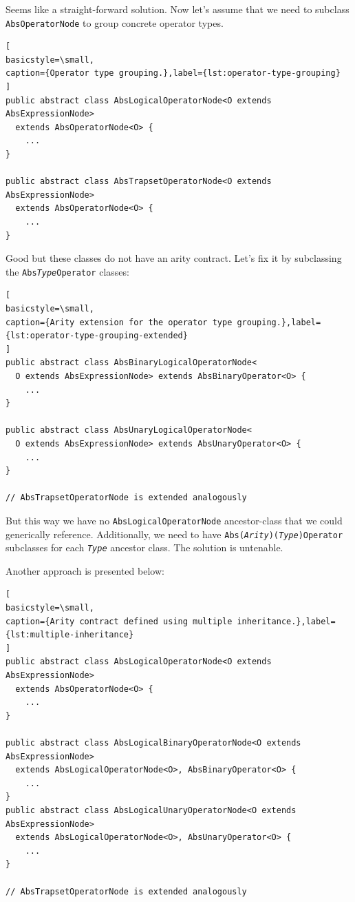 \documentclass[12pt,oneside,a4paper,notitlepage]{report}
\begin{document}
	\bigskip

	\par Seems like a straight-forward solution. Now let's assume that we need to subclass \texttt{AbsOperatorNode} to group concrete operator types.

	\begin{lstlisting}[
basicstyle=\small,
caption={Operator type grouping.},label={lst:operator-type-grouping}
]
public abstract class AbsLogicalOperatorNode<O extends AbsExpressionNode>
  extends AbsOperatorNode<O> {
	...
}

public abstract class AbsTrapsetOperatorNode<O extends AbsExpressionNode>
  extends AbsOperatorNode<O> {
	...
}
	\end{lstlisting}

	\bigskip

	\par Good but these classes do not have an arity contract. Let's fix it by subclassing the \texttt{Abs\textit{Type}Operator} classes:
	\begin{lstlisting}[
basicstyle=\small,
caption={Arity extension for the operator type grouping.},label={lst:operator-type-grouping-extended}
]
public abstract class AbsBinaryLogicalOperatorNode<
  O extends AbsExpressionNode> extends AbsBinaryOperator<O> {
	...
}

public abstract class AbsUnaryLogicalOperatorNode<
  O extends AbsExpressionNode> extends AbsUnaryOperator<O> {
	...
}

// AbsTrapsetOperatorNode is extended analogously
	\end{lstlisting}

	\bigskip

	\par But this way we have no \texttt{AbsLogicalOperatorNode} ancestor-class that we could generically reference. 
	Additionally, we need to have \texttt{Abs(\textit{Arity})(\textit{Type})Operator} subclasses for each \texttt{\textit{Type}} ancestor class. The solution is untenable.

	\bigskip

	\par Another approach is presented below:
	\begin{lstlisting}[
basicstyle=\small,
caption={Arity contract defined using multiple inheritance.},label={lst:multiple-inheritance}
]
public abstract class AbsLogicalOperatorNode<O extends AbsExpressionNode>
  extends AbsOperatorNode<O> {
	...
}

public abstract class AbsLogicalBinaryOperatorNode<O extends AbsExpressionNode>
  extends AbsLogicalOperatorNode<O>, AbsBinaryOperator<O> {
	...
}
public abstract class AbsLogicalUnaryOperatorNode<O extends AbsExpressionNode>
  extends AbsLogicalOperatorNode<O>, AbsUnaryOperator<O> {
	...
}

// AbsTrapsetOperatorNode is extended analogously
	\end{lstlisting}
	\bigskip 
\end{document}
